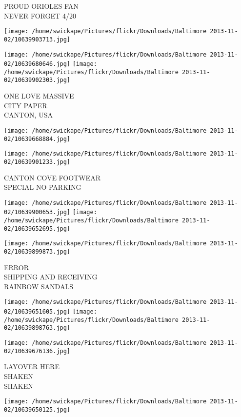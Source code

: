 \documentclass[10pt,letterpaper]{article}
\begin{document}
PROUD ORIOLES FAN\\
NEVER FORGET 4/20
\pagebreak

\texttt{[image: /home/swickape/Pictures/flickr/Downloads/Baltimore 2013-11-02/10639903713.jpg]}

\vspace{0.25in}
\texttt{[image: /home/swickape/Pictures/flickr/Downloads/Baltimore 2013-11-02/10639680646.jpg]}
\texttt{[image: /home/swickape/Pictures/flickr/Downloads/Baltimore 2013-11-02/10639902303.jpg]}

ONE LOVE MASSIVE\\
CITY PAPER\\
CANTON, USA
\pagebreak

\texttt{[image: /home/swickape/Pictures/flickr/Downloads/Baltimore 2013-11-02/10639668884.jpg]}

\vspace{0.25in}
\texttt{[image: /home/swickape/Pictures/flickr/Downloads/Baltimore 2013-11-02/10639901233.jpg]}

CANTON COVE FOOTWEAR\\
SPECIAL NO PARKING
\pagebreak

\texttt{[image: /home/swickape/Pictures/flickr/Downloads/Baltimore 2013-11-02/10639900653.jpg]}
\texttt{[image: /home/swickape/Pictures/flickr/Downloads/Baltimore 2013-11-02/10639652695.jpg]}

\vspace{0.25in}
\texttt{[image: /home/swickape/Pictures/flickr/Downloads/Baltimore 2013-11-02/10639899873.jpg]}

ERROR\\
SHIPPING AND RECEIVING\\
RAINBOW SANDALS
\pagebreak

\texttt{[image: /home/swickape/Pictures/flickr/Downloads/Baltimore 2013-11-02/10639651605.jpg]}
\texttt{[image: /home/swickape/Pictures/flickr/Downloads/Baltimore 2013-11-02/10639898763.jpg]}

\vspace{0.25in}
\texttt{[image: /home/swickape/Pictures/flickr/Downloads/Baltimore 2013-11-02/10639676136.jpg]}

LAYOVER HERE\\
SHAKEN\\
SHAKEN
\pagebreak

\texttt{[image: /home/swickape/Pictures/flickr/Downloads/Baltimore 2013-11-02/10639650125.jpg]}
\end{document}
